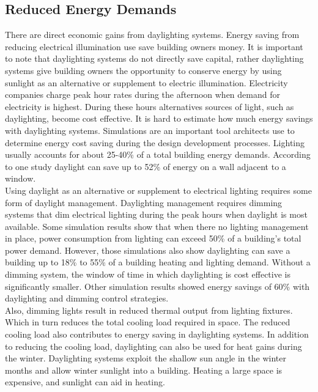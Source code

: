 	\subsection{Reduced Energy Demands}
		There are direct economic gains from daylighting systems. Energy saving from reducing electrical illumination use save building owners money.
		It is important to note that daylighting systems do not directly save capital, rather daylighting systems give building owners the opportunity to conserve energy by using sunlight as an alternative or supplement to electric illumination. Electricity companies charge peak hour rates during the afternoon when demand for electricity is highest. During these hours alternatives sources of light, such as daylighting, become cost effective.
		It is hard to estimate how much energy savings with daylighting systems. Simulations are an important tool architects use to determine energy cost saving during the design development processes.  Lighting usually accounts for about 25-40\% of a total building energy demands.
		According to one study daylight can save up to 52\% of energy on a wall adjacent to a window\cite{Leslie}.\\

		Using daylight as an alternative or supplement to electrical lighting requires some form of daylight management. Daylighting management requires dimming systems that dim electrical lighting during the peak hours when daylight is most available.  Some simulation results show that when there no lighting management in place,  power consumption from lighting can exceed 50\% of a building's total power demand.
		However, those simulations also show daylighting can save a building up to 18\% to 55\% of a building heating and lighting demand\cite{Bodart}.
		Without a dimming system, the window of time in which daylighting is cost effective is significantly smaller. Other simulation results showed energy savings of 60\% with daylighting and dimming control strategies\cite{Ihm}. \\

		Also, dimming lights result in reduced thermal output from lighting fixtures. Which in turn reduces the total cooling load required in space. The reduced cooling load also contributes to energy saving in daylighting systems\cite{Leslie}. In addition to reducing the cooling load, daylighting can also be used for heat gains during the winter. Daylighting systems exploit the shallow sun angle in the winter months and allow winter sunlight into a building. Heating a large space is expensive, and sunlight can aid in heating\cite{Bodart}. \\

